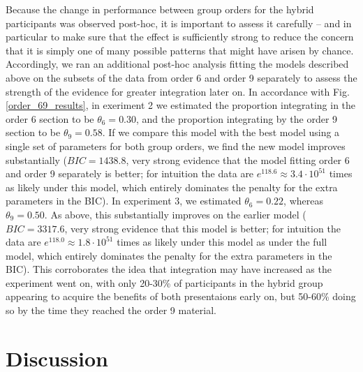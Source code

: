 \documentclass[man,10pt]{apa6}
\begin{document}
Because the change in performance between group orders for the hybrid participants was observed post-hoc, it is important to assess it carefully -- and in particular to make sure that the effect is sufficiently strong to reduce the concern that it is simply one of many possible patterns that might have arisen by chance. Accordingly, we ran an additional post-hoc analysis fitting the models described above on the subsets of the data from order 6 and order 9 separately to assess the strength of the evidence for greater integration later on. In accordance with Fig. \ref{order_69_results}, in exeriment 2 we estimated the proportion integrating in the order 6 section to be $\theta_6 = 0.30$, and the proportion integrating by the order 9 section to be $\theta_9 = 0.58$. If we compare this model with the best model using a single set of parameters for both group orders, we find the new model improves substantially ($BIC = 1438.8$, very strong evidence that the model fitting order 6 and order 9 separately is better; for intuition the data are $e^{118.6} \approx 3.4 \cdot 10^{51}$ times as likely under this model, which entirely dominates the penalty for the extra parameters in the BIC). In experiment 3, we estimated $\theta_6 = 0.22$, whereas $\theta_9 = 0.50$. As above, this substantially improves on the earlier model ($BIC=3317.6$, very strong evidence that this model is better; for intuition the data are $e^{118.0} \approx 1.8 \cdot 10^{51}$ times as likely under this model as under the full model, which entirely dominates the penalty for the extra parameters in the BIC). This corroborates the idea that integration may have increased as the experiment went on, with only 20-30\% of participants in the hybrid group appearing to acquire the benefits of both presentaions early on, but 50-60\% doing so by the time they reached the order 9 material.
\section{Discussion}
\end{document}
